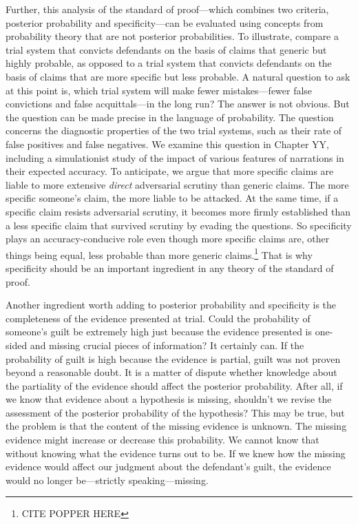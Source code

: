 \documentclass[
  10pt,
  dvipsnames,enabledeprecatedfontcommands]{scrartcl}
\begin{document}
Further, this analysis of the standard of proof---which combines two
criteria, posterior probability and specificity---can be evaluated using
concepts from probability theory that are not posterior probabilities.
To illustrate, compare a trial system that convicts defendants on the
basis of claims that generic but highly probable, as opposed to a trial
system that convicts defendants on the basis of claims that are more
specific but less probable. A natural question to ask at this point is,
which trial system will make fewer mistakes---fewer false convictions
and false acquittals---in the long run? The answer is not obvious. But
the question can be made precise in the language of probability. The
question concerns the diagnostic properties of the two trial systems,
such as their rate of false positives and false negatives. We examine
this question in Chapter YY, including a simulationist study of the
impact of various features of narrations in their expected accuracy.
 To anticipate, we argue that more
specific claims are liable to more extensive \emph{direct} adversarial
scrutiny than generic claims. The more specific someone's claim, the
more liable to be attacked. At the same time, if a specific claim
resists adversarial scrutiny, it becomes more firmly established than a
less specific claim that survived scrutiny by evading the questions. So
specificity plays an accuracy-conducive role even though more specific
claims are, other things being equal, less probable than more generic
claims.\footnote{CITE POPPER HERE} That is why specificity should be an
important ingredient in any theory of the standard of proof.

Another ingredient worth adding to posterior probability and specificity
is the completeness of the evidence presented at trial. Could the
probability of someone's guilt be extremely high just because the
evidence presented is one-sided and missing crucial pieces of
information? It certainly can. If the probability of guilt is high
because the evidence is partial, guilt was not proven beyond a
reasonable doubt. It is a matter of dispute whether knowledge about the
partiality of the evidence should affect the posterior probability.
After all, if we know that evidence about a hypothesis is missing,
shouldn't we revise the assessment of the posterior probability of the
hypothesis? This may be true, but the problem is that the content of the
missing evidence is unknown. The missing evidence might increase or
decrease this probability. We cannot know that without knowing what the
evidence turns out to be. If we knew how the missing evidence would
affect our judgment about the defendant's guilt, the evidence would no
longer be---strictly speaking---missing.
\end{document}
